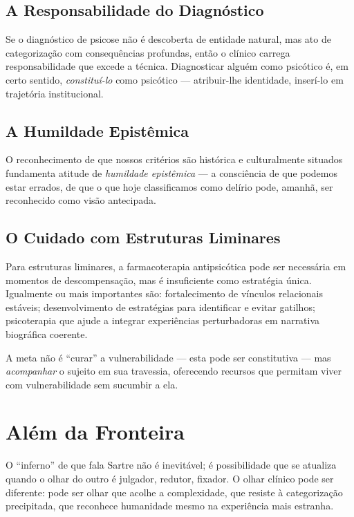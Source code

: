 \subsection{A Responsabilidade do Diagnóstico}

Se o diagnóstico de psicose não é descoberta de entidade natural, mas ato de categorização com consequências profundas, então o clínico carrega responsabilidade que excede a técnica. Diagnosticar alguém como psicótico é, em certo sentido, \textit{constituí-lo} como psicótico --- atribuir-lhe identidade, inserí-lo em trajetória institucional.

\subsection{A Humildade Epistêmica}

O reconhecimento de que nossos critérios são histórica e culturalmente situados fundamenta atitude de \textit{humildade epistêmica} --- a consciência de que podemos estar errados, de que o que hoje classificamos como delírio pode, amanhã, ser reconhecido como visão antecipada.

\subsection{O Cuidado com Estruturas Liminares}

Para estruturas liminares, a farmacoterapia antipsicótica pode ser necessária em momentos de descompensação, mas é insuficiente como estratégia única. Igualmente ou mais importantes são: fortalecimento de vínculos relacionais estáveis; desenvolvimento de estratégias para identificar e evitar gatilhos; psicoterapia que ajude a integrar experiências perturbadoras em narrativa biográfica coerente.

A meta não é \enquote{curar} a vulnerabilidade --- esta pode ser constitutiva --- mas \textit{acompanhar} o sujeito em sua travessia, oferecendo recursos que permitam viver com vulnerabilidade sem sucumbir a ela.

\section{Além da Fronteira}
\label{sec:alem-fronteira}

O \enquote{inferno} de que fala Sartre não é inevitável; é possibilidade que se atualiza quando o olhar do outro é julgador, redutor, fixador. O olhar clínico pode ser diferente: pode ser olhar que acolhe a complexidade, que resiste à categorização precipitada, que reconhece humanidade mesmo na experiência mais estranha.

